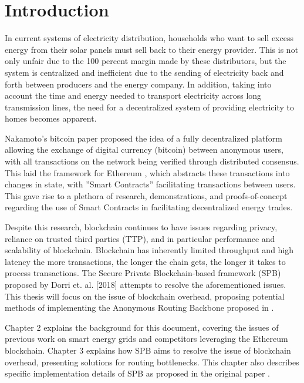 \chapter{Introduction}\label{ch:intro}


In current systems of electricity distribution, households who want to sell excess energy from their solar panels must sell back to their energy provider. This is not only unfair due to the 100 percent margin made by these distributors, but the system is centralized and inefficient due to the sending of electricity back and forth between producers and the energy company. In addition, taking into account the time and energy needed to transport electricity across long transmission lines, the need for a decentralized system of providing electricity to homes becomes apparent. 

Nakamoto’s bitcoin paper \cite{bitcoinpaper} proposed the idea of a fully decentralized platform allowing the exchange of digital currency (bitcoin) between anonymous users, with all transactions on the network being verified through distributed consensus. This laid the framework for Ethereum 
\cite{ethereumpaper}, which abstracts these transactions into changes in state, with ”Smart Contracts” facilitating transactions between users. This gave rise to a plethora of research, demonstrations, and proofs-of-concept regarding the use of Smart Contracts in facilitating decentralized energy trades. 

Despite this research, blockchain continues to have issues regarding privacy, reliance on trusted third parties (TTP), and in particular performance and scalability of blockchain. Blockchain has inherently limited throughput and high latency \cite{Vuk16} the more transactions, the longer the chain gets, the longer it takes to process transactions. The Secure Private Blockchain-based framework (SPB) proposed by Dorri et. al. [2018] attempts to resolve the aforementioned issues. This thesis will focus on the issue of blockchain overhead, proposing potential methods of implementing the Anonymous Routing Backbone proposed in \cite{spb}.

Chapter 2 explains the background for this document, covering the issues of previous work on smart energy grids and competitors leveraging the Ethereum blockchain. Chapter 3 explains how SPB aims to resolve the issue of blockchain overhead, presenting solutions for routing bottlenecks. This chapter also describes specific implementation details of SPB as proposed in the original paper \cite{spb}.
